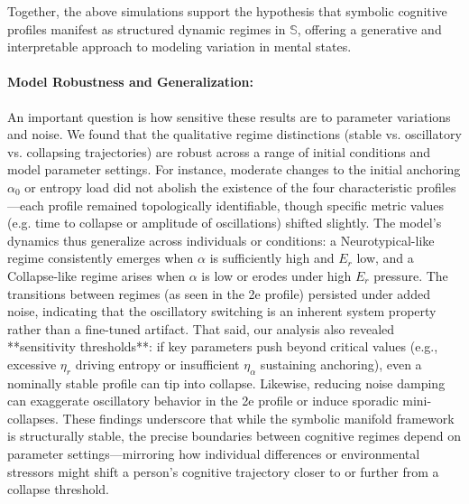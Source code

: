 Together, the above simulations support the hypothesis that symbolic cognitive profiles manifest as structured dynamic regimes in $\mathbb{S}$, offering a generative and interpretable approach to modeling variation in mental states. 

\paragraph{Model Robustness and Generalization:} An important question is how sensitive these results are to parameter variations and noise. We found that the qualitative regime distinctions (stable vs. oscillatory vs. collapsing trajectories) are robust across a range of initial conditions and model parameter settings. For instance, moderate changes to the initial anchoring $\alpha_0$ or entropy load did not abolish the existence of the four characteristic profiles—each profile remained topologically identifiable, though specific metric values (e.g. time to collapse or amplitude of oscillations) shifted slightly. The model’s dynamics thus generalize across individuals or conditions: a Neurotypical-like regime consistently emerges when $\alpha$ is sufficiently high and $E_r$ low, and a Collapse-like regime arises when $\alpha$ is low or erodes under high $E_r$ pressure. The transitions between regimes (as seen in the 2e profile) persisted under added noise, indicating that the oscillatory switching is an inherent system property rather than a fine-tuned artifact. That said, our analysis also revealed **sensitivity thresholds**: if key parameters push beyond critical values (e.g., excessive $\eta_r$ driving entropy or insufficient $\eta_\alpha$ sustaining anchoring), even a nominally stable profile can tip into collapse. Likewise, reducing noise damping can exaggerate oscillatory behavior in the 2e profile or induce sporadic mini-collapses. These findings underscore that while the symbolic manifold framework is structurally stable, the precise boundaries between cognitive regimes depend on parameter settings—mirroring how individual differences or environmental stressors might shift a person’s cognitive trajectory closer to or further from a collapse threshold.

